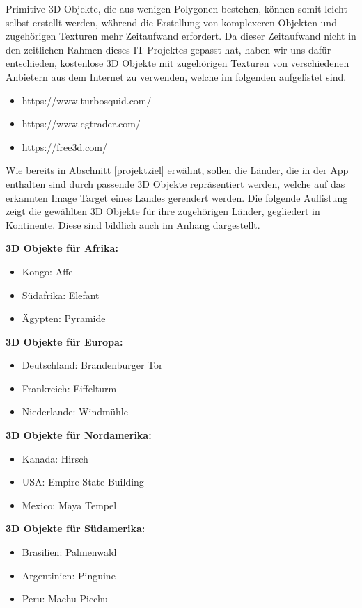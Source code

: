 Primitive 3D Objekte, die aus wenigen Polygonen bestehen, können somit leicht selbst erstellt werden, während die Erstellung von komplexeren Objekten und zugehörigen Texturen mehr Zeitaufwand erfordert. 
Da dieser Zeitaufwand nicht in den zeitlichen Rahmen dieses IT Projektes gepasst hat, haben wir uns dafür entschieden, kostenlose 3D Objekte mit zugehörigen Texturen von verschiedenen Anbietern aus dem Internet zu verwenden, welche im folgenden aufgelistet sind.

\begin{itemize}
\item https://www.turbosquid.com/
\item https://www.cgtrader.com/
\item https://free3d.com/
\end{itemize}

Wie bereits in Abschnitt \ref{projektziel} erwähnt, sollen die Länder, die in der App enthalten sind durch passende 3D Objekte repräsentiert werden, welche auf das erkannten Image Target eines Landes gerendert werden. 
Die folgende Auflistung zeigt die gewählten 3D Objekte für ihre zugehörigen Länder, gegliedert in Kontinente. Diese sind bildlich auch im Anhang dargestellt.

\textbf{3D Objekte für Afrika:}
\begin{itemize}
\item Kongo: Affe
\item Südafrika: Elefant
\item Ägypten: Pyramide
\end{itemize}

\textbf{3D Objekte für Europa:}
\begin{itemize}
\item Deutschland: Brandenburger Tor	
\item Frankreich: Eiffelturm
\item Niederlande: Windmühle
\end{itemize}

\textbf{3D Objekte für Nordamerika:}
\begin{itemize}
\item Kanada: Hirsch
\item USA: Empire State Building
\item Mexico: Maya Tempel
\end{itemize}

\textbf{3D Objekte für Südamerika:}
\begin{itemize}
\item Brasilien: Palmenwald
\item Argentinien: Pinguine
\item Peru: Machu Picchu
\end{itemize}

